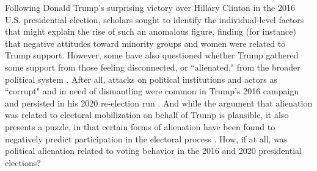 \documentclass[12pt]{article}
\begin{document}


Following Donald Trump's surprising victory over Hillary Clinton in the 2016 U.S. presidential election, scholars sought to identify the individual-level factors that might explain the rise of such an anomalous figure, finding (for instance) that negative attitudes toward minority groups \parencite{hooghe2018explaining,sides2018identity,mason2021activating} and women \parencite{valentino2018mobilizing} were related to Trump support. However, some have also questioned whether Trump gathered some support from those feeling disconnected, or ``alienated," from the broader political system \parencite[e.g.,][]{dyck2018primary,uscinski2021american}. After all, attacks on political institutions and actors as ``corrupt" and in need of dismantling were common in Trump's 2016 campaign and persisted in his 2020 re-election run \parencite{parker2020permanent}. And while the argument that alienation was related to electoral mobilization on behalf of Trump is plausible, it also presents a puzzle, in that certain forms of alienation have been found to negatively predict participation in the electoral process \parencite[e.g.][]{templeton1966alienation}. How, if at all, was political alienation related to voting behavior in the 2016 and 2020 presidential elections?
\end{document}
